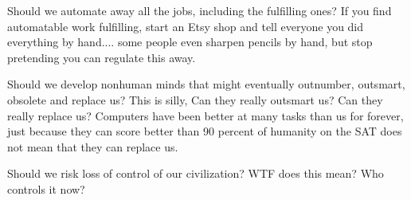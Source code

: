 Should we automate away all the jobs, including the fulfilling ones? If you find automatable work fulfilling, start an Etsy shop and tell everyone you did everything by hand.... some people even sharpen pencils by hand, but stop pretending you can regulate this away. 

Should we develop nonhuman minds that might eventually outnumber, outsmart, obsolete and replace us? This is silly, Can they really outsmart us? Can they really replace us? Computers have been better at many tasks than us for forever, just because they can score better than 90 percent of humanity on the SAT does not mean that they can replace us. 

Should we risk loss of control of our civilization? WTF does this mean? Who controls it now?

